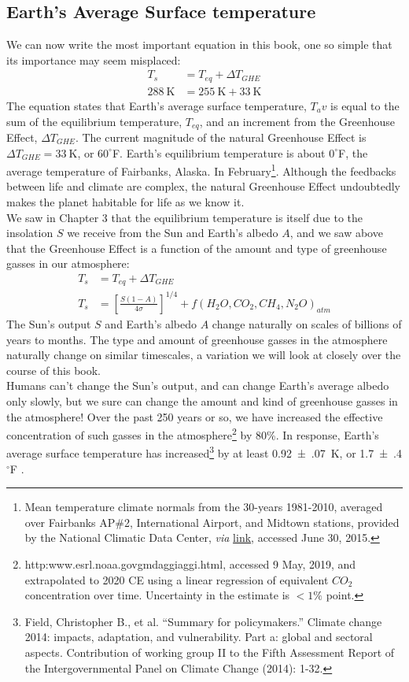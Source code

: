 \subsection{Earth's Average Surface temperature}
We can now write the most important equation in this book, one so simple that its importance may seem misplaced:
\begin{align}
	T_s&=T_{eq}+\Delta T_{GHE}\\
	\SI{288}{\kelvin}&=\SI{255}{\kelvin}+\SI{33}{\kelvin}
\end{align}
The equation states that Earth's average surface temperature, $T_av$ is equal to the sum of the equilibrium temperature, $T_{eq}$, and an increment from the Greenhouse Effect, $\Delta T_{GHE}$. The current magnitude of the natural Greenhouse Effect is $\Delta T_{GHE}=\SI{33}{\kelvin}$, or $60^{\circ}$F. Earth's equilibrium temperature is about $0^{\circ}$F, the average temperature of Fairbanks, Alaska. In February\footnote{Mean temperature climate normals from the 30-years 1981-2010, averaged over Fairbanks AP\#2, International Airport, and Midtown stations, provided by the National Climatic Data Center, \textit{via} \href{http://climate.gi.alaska.edu/Climate/Normals}{link}, accessed June 30, 2015.}. Although the feedbacks between life and climate are complex, the natural Greenhouse Effect undoubtedly makes the planet habitable for life as we know it.\\ 
We saw in Chapter 3 that the equilibrium temperature is itself due to the insolation $S$ we receive from the Sun and Earth's albedo $A$, and we saw above that the Greenhouse Effect is a function of the amount and type of greenhouse gasses in our atmosphere:
\begin{align}
	T_s&=T_{eq}+\Delta T_{GHE}\\ \label{eq:Ts}
	T_s&=\left[\frac{S(1-A)}{4 \sigma}\right]^{1/4} + f(H_2O, CO_2, CH_4, N_2O)_{atm}
\end{align}
The Sun's output $S$ and Earth's albedo $A$ change naturally on scales of billions of years to months. The type and amount of greenhouse gasses in the atmosphere naturally change on similar timescales, a variation we will look at closely over the course of this book.\\ 
Humans can't change the Sun's output, and can change Earth's average albedo only slowly, but we sure can change the amount and kind of greenhouse gasses in the atmosphere! Over the past 250 years or so, we have increased the effective concentration of such gasses in the atmosphere\footnote{http:\/\/www.esrl.noaa.gov\/gmd\/aggi\/aggi.html, accessed 9 May, 2019, and extrapolated to 2020 CE using a linear regression of equivalent $CO_2$ concentration over time. Uncertainty in the estimate is $<1\%$ point.} by 80\%. In response, Earth's average surface temperature has increased\footnote{Field, Christopher B., et al. ``Summary for policymakers.'' Climate change 2014: impacts, adaptation, and vulnerability. Part a: global and sectoral aspects. Contribution of working group II to the Fifth Assessment Report of the Intergovernmental Panel on Climate Change (2014): 1-32.} by at least \SI[separate-uncertainty]{0.92(07)}{\kelvin}, or \SI[separate-uncertainty]{1.7(4)}{} $^{\circ}$F .


